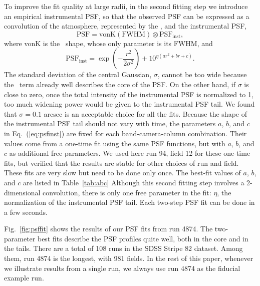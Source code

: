 To improve the fit quality at large radii, in the second fitting step we introduce an
empirical instrumental PSF, so that the observed PSF can be expressed as
a convolution of the atmosphere, represented by the \vk, and
the instrumental PSF,
\begin{equation}
        \textrm{PSF} = \textrm{vonK} (\textrm{FWHM}) \otimes \textrm{PSF}_{\textrm{inst}},
\end{equation} 
where vonK is the \vk~shape, whose only parameter is its FWHM, and
\begin{equation}
        \textrm{PSF}_{\textrm{inst}} = \exp(-\frac{r^2}{2\sigma^2}) + 10^{\eta(ar^2+br+c)}.
\label{eq:psfinst}
\end{equation} 
The standard deviation of the central Gaussian, $\sigma$, cannot be
too wide because the \vk~term already well describes the core of the PSF.
On the other hand, if $\sigma$ is close to zero, once the
total intensity of the instrumental PSF is normalized to 1, too much
widening power would be given to the instrumental PSF tail.
We found that $\sigma = 0.1$ arcsec is an acceptable choice for all the fits.
Because the shape of the instrumental PSF tail should not vary with
time, the parameters $a$, $b$, and $c$ in Eq.~(\ref{eq:psfinst}) are
fixed for each band-camera-column combination.
Their values come from a one-time fit using the same PSF functions,
but with $a$, $b$, and $c$ as additional free parameters.
We used here run 94, field 12 for these one-time fits, but verified that 
the results are stable for other choices of run and field. 
These fits are very slow but need to be done only once.
The best-fit values of $a$, $b$, and $c$ are listed in Table~\ref{tab:abc}
Although this second fitting step involves a 2-dimensional convolution,
there is only one free parameter in the fit: $\eta$, the normalization of the
instrumental PSF tail. Each two-step PSF fit can be done in a few seconds.

Fig.~\ref{fig:psffit} shows the results of our PSF fits from run 4874. The two-parameter
best fits describe the PSF profiles quite well, both in the core and in the tails. There are 
a total of 108 runs in the SDSS Stripe 82 dataset. Among them, run 4874 is the longest, 
with 981 fields. In the rest of this paper, whenever we illustrate results from a single run, 
we always use run 4874 as the fiducial example run. 



